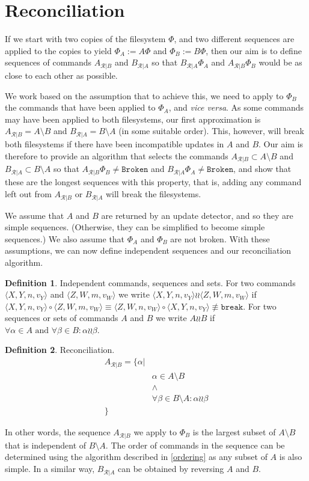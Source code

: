 \documentclass[12pt]{article}
\newcommand{\fsbroken}{\mathtt{Broken}} %
\newcommand{\FS}{\Phi} %
\newcommand{\cbrk}{\mathtt{break}} %
\newcommand{\valvy}{v_Y} %
\newcommand{\valvw}{v_W}
\newcommand{\caaaa}[4]{\langle{#1,#2,#3,#4}\rangle}
\newcommand{\cxynv}{\caaaa{X}{Y}{n}{\valvy}}
\newcommand{\czwnv}{\caaaa{Z}{W}{n}{\valvw}}
\newcommand{\czwmv}{\caaaa{Z}{W}{m}{\valvw}}
\newcommand{\cc}{\circ} %
\newcommand{\nequiv}{\not\equiv}
\newcommand{\indep}{\mathrel{\wr\wr}} %
\newcommand{\recchar}[3]{{#1}^{#3}_{\mathcal{R}|{#2}}}
\newcommand{\reca}{\recchar{A}{B}{}} %
\newcommand{\recb}{\recchar{B}{A}{}} %
\theoremstyle{definition}
\newtheorem{mydef}{Definition}
\begin{document}
\section{Reconciliation}

If we start with two copies of the filesystem $\FS$,
and two different sequences are applied to the copies to yield $\FS_A:=A\FS$
and $\FS_B:=B\FS$, then our aim is to define sequences of commands $\reca$ and $\recb$
so that $\recb\FS_A$ and $\reca\FS_B$ would be as close to each other as possible.

We work based on the assumption that to achieve this, we need
to apply to $\FS_B$ the commands that have been applied to $\FS_A$, and \emph{vice versa}.
As some commands may have been applied to both filesystems, our first approximation
is $\reca = A\setminus B$ and $\recb = B\setminus A$
(in some suitable order).
This, however, will break both filesystems if there have been incompatible updates
in $A$ and $B$. 
Our aim is therefore to provide an algorithm that selects the commands 
$\reca \subset A\setminus B$
and $\recb \subset B\setminus A$ 
so that $\reca\FS_B\neq\fsbroken$ and $\recb\FS_A\neq\fsbroken$,
and show that these are the longest sequences with this property, that is,
adding any command left out from $\reca$ or $\recb$ will break the filesystems.

We assume that $A$ and $B$ are returned by an update detector,
and so they are simple sequences.
(Otherwise, they can be simplified to become simple sequences.)
We also assume that $\FS_A$ and $\FS_B$ are not broken.
With these assumptions,
we can now define independent sequences and
our reconciliation algorithm.

\begin{mydef}{Independent commands, sequences and sets.}
For two commands $\cxynv$ and $\czwmv$ we write $\cxynv\indep\czwmv$ if $\cxynv\cc\czwmv \equiv \czwnv\cc\cxynv \nequiv \cbrk$.
For two sequences or sets of commands $A$ and $B$ we write $A\indep B$ if
$\forall \alpha\in A \mbox{~and~} \forall \beta\in B: \alpha\indep\beta$.
\end{mydef}

\begin{mydef}{Reconciliation.}\label{def:reconciliation}
\begin{align*}
\reca = \{\alpha| & \\
& \alpha\in A\setminus B \\
& \wedge \\
& \forall \beta\in B\setminus A: \alpha\indep\beta\\
\} &
\end{align*}

In other words, the sequence $\reca$ we apply to $\FS_B$ 
is the largest subset of $A\setminus B$
that is independent of $B\setminus A$.
The order of commands in the sequence can be determined using the algorithm described in
\cref{ordering} as any subset of $A$ is also simple.
In a similar way, $\recb$ can be obtained by reversing $A$ and $B$.
\end{mydef}
\end{document}
